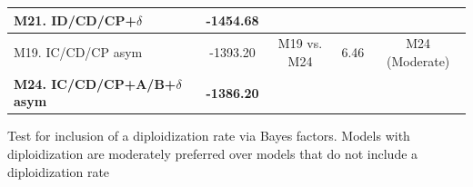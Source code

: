 \begin{supptable}
\begin{tabular}{|l|c|c|c|c|}
\textbf{M21. ID/CD/CP+$\delta$}          & \textbf{-1454.68}                                                 &             &                 &                                                                      \\ \hline
M19. IC/CD/CP asym                       & -1393.20                                                          & M19 vs. M24 & 6.46            & M24 (Moderate)                                                       \\
\textbf{M24. IC/CD/CP+A/B+$\delta$ asym} & \textbf{-1386.20}                                                 &             &                 &                                                                      \\ \hline
\end{tabular}
\caption{Test for inclusion of a diploidization rate via Bayes factors. Models with diploidization are moderately preferred over models that do not include a diploidization rate}
\label{supptable:testdiploidization}
\end{supptable}


